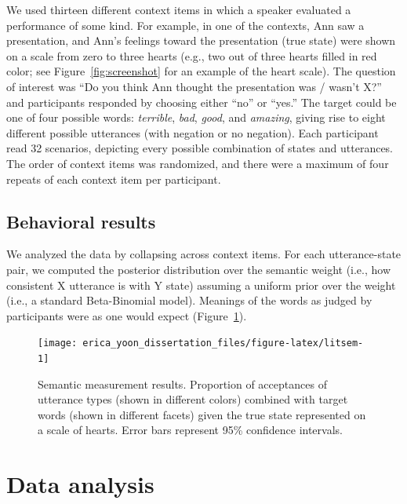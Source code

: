 \documentclass[oneside]{report}
\begin{document}
We used thirteen different context items in which a speaker evaluated a
performance of some kind. For example, in one of the contexts, Ann saw a
presentation, and Ann's feelings toward the presentation (true state)
were shown on a scale from zero to three hearts (e.g., two out of three
hearts filled in red color; see Figure~\ref{fig:screenshot} for an
example of the heart scale). The question of interest was ``Do you think
Ann thought the presentation was / wasn't X?'' and participants
responded by choosing either ``no'' or ``yes.'' The target could be one
of four possible words: \emph{terrible}, \emph{bad}, \emph{good}, and
\emph{amazing}, giving rise to eight different possible utterances (with
negation or no negation). Each participant read 32 scenarios, depicting
every possible combination of states and utterances. The order of
context items was randomized, and there were a maximum of four repeats
of each context item per participant.

\subsection{Behavioral results}\label{behavioral-results-1}

We analyzed the data by collapsing across context items. For each
utterance-state pair, we computed the posterior distribution over the
semantic weight (i.e., how consistent X utterance is with Y state)
assuming a uniform prior over the weight (i.e., a standard Beta-Binomial
model). Meanings of the words as judged by participants were as one
would expect (Figure~\ref{fig:litsem}).
\begin{figure}[!h]

{\centering \texttt{[image: erica\_yoon\_dissertation\_files/figure-latex/litsem-1]} 

}

\caption[Semantic measurement results from the experiment in Chapter 4.]{Semantic measurement results. Proportion of acceptances of utterance types (shown in different colors) combined with target words (shown in different facets) given the true state represented on a scale of hearts. Error bars represent 95\% confidence intervals.}\label{fig:litsem}
\end{figure}
\section{Data analysis}\label{data-analysis}
\end{document}
